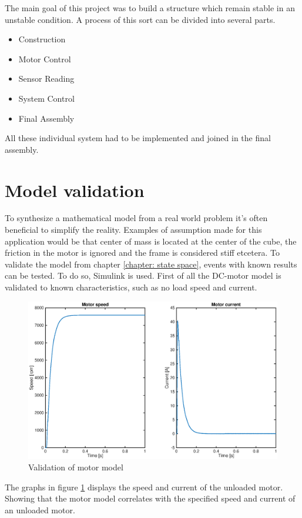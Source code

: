 \documentclass[a4paper,11pt]{kth-mag}
\begin{document}
The main goal of this project was to build a structure which remain stable in an unstable condition. A process of this sort can be divided into several parts. 
\begin{itemize}
\item Construction
\item Motor Control
\item Sensor Reading
\item System Control
\item Final Assembly
\end{itemize}
All these individual system had to be implemented and joined in the final assembly.
\section{Model validation}
To synthesize a mathematical model from a real world problem it's often beneficial to simplify the reality. Examples of assumption made for this application would be that center of mass is located at the center of the cube, the friction in the motor is ignored and the frame is considered stiff etcetera. 
To validate the model from chapter \ref{chapter: state space}, events with known results can be tested. To do so, Simulink \cite{MATLAB:2014} is used.
First of all the DC-motor model is validated to known characteristics, such as no load speed and current. 

\begin{figure}[!htb] 
\centering
\includegraphics[width = \textwidth]{Motor_noload.eps}
\caption{Validation of motor model}
\label{fig:Motor noload}
\end{figure}

The graphs in figure \ref{fig:Motor noload} displays the speed and current of the unloaded motor. Showing that the motor model correlates with the specified speed and current of an unloaded motor.
\end{document}
